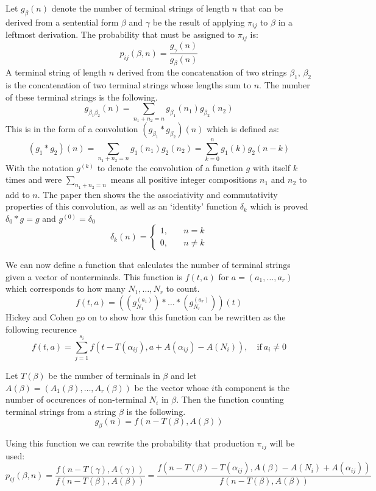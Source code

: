   Let $g_\beta(n)$ denote the number of terminal strings of length $n$ that can be derived from a sentential form $\beta$ and $\gamma$ be the result of applying $\pi_{ij}$ to $\beta$ in a leftmost derivation. The probability that must be assigned to $\pi_{ij}$ is:
  \[
  p_{ij}(\beta, n) = \frac{g_\gamma(n)}{g_\beta(n)}
  \]
  A terminal string of length $n$ derived from the concatenation of two strings $\beta_1$, $\beta_2$ is the concatenation of two terminal strings whose lengths sum to $n$. The number of these terminal strings is the following.
  \[
  g_{\beta_1\beta_2}(n) = \sum_{n_1+n_2=n}g_{\beta_1}(n_1)g_{\beta_2}(n_2)
  \]
  This is in the form of a convolution $(g_{\beta_1} * g_{\beta_2})(n)$ which is defined as:
  \[
  (g_1 * g_2)(n) = \sum_{n_1+n_2=n}g_1(n_1)g_2(n_2) = \sum_{k=0}^{n} g_1(k)g_2(n-k)
  \]
  With the notation $g^{(k)}$ to denote the convolution of a function $g$ with itself $k$ times and were $\sum_{n_1+n_2=n}$ means all positive integer compositions $n_1$ and $n_2$ to add to $n$. The paper then shows the the associativity and commutativity properties of this convolution, as well as an `identity' function $\delta_k$ which is proved $\delta_0 * g = g$ and $g^{(0)} = \delta_0$
  \[
  \delta_k(n) = \left\{\begin{aligned}
    1, \quad & n = k\\
    0, \quad & n \neq k
  \end{aligned}\right.
  \]


  We can now define a function that calculates the number of terminal strings given a vector of nonterminals. This function is $f(t, a)$ for $a = (a_1,\dots,a_r)$ which corresponds to how many $N_1,\dots,N_r$ to count.
  \[
  f(t, a) = \left((g_{N_1}^{(a_1)}) * \hdots * (g_{N_r}^{(a_r)})\right)(t)
  \]
  Hickey and Cohen go on to show how this function can be rewritten as the following recurence
  \[
  f(t,a) = \sum_{j=1}^{s_i}f(t-T(\alpha_{ij}), a+A(\alpha_{ij})-A(N_i)), \quad\mathrm{if}\ a_i \neq 0
  \]

  Let $T(\beta)$ be the number of terminals in $\beta$ and let $A(\beta) = (A_1(\beta),\dots,A_r(\beta))$ be the vector whose $i$th component is the number of occurences of non-terminal $N_i$ in $\beta$. Then the function counting terminal strings from a string $\beta$ is the following.
  \[
  g_\beta(n) = f(n-T(\beta), A(\beta))
  \]

  Using this function we can rewrite the probability that production $\pi_{ij}$ will be used:
  \[
  p_{ij}(\beta, n) = \frac{f(n - T(\gamma), A(\gamma))}{f(n-T(\beta), A(\beta))} = \frac{f(n-T(\beta)-T(\alpha_{ij}),A(\beta)-A(N_i)+A(\alpha_{ij}))}{f(n-T(\beta),A(\beta))}
  \]

